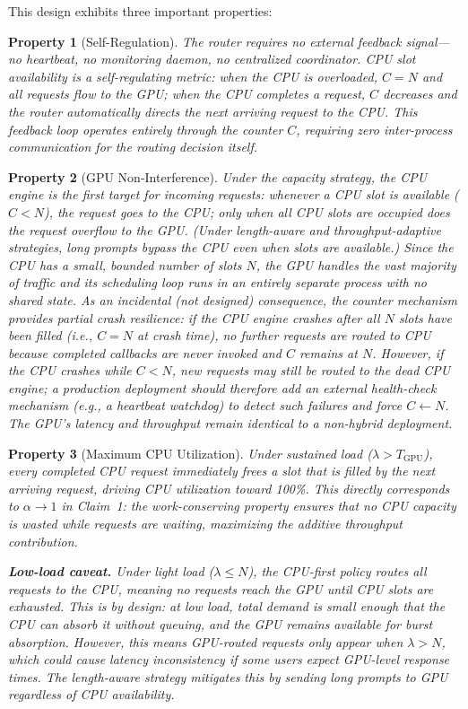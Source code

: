 \documentclass[10pt,conference]{IEEEtran}
\newtheorem{property}{Property}
\begin{document}
This design exhibits three important properties:

\begin{property}[Self-Regulation]
The router requires no external feedback signal---no heartbeat, no monitoring daemon, no centralized coordinator.
CPU slot availability is a self-regulating metric: when the CPU is overloaded, $C = N$ and all requests flow to the GPU; when the CPU completes a request, $C$ decreases and the router automatically directs the next arriving request to the CPU.
This feedback loop operates entirely through the counter $C$, requiring zero inter-process communication for the routing decision itself.
\end{property}

\begin{property}[GPU Non-Interference]
Under the capacity strategy, the CPU engine is the \emph{first} target for incoming requests: whenever a CPU slot is available ($C < N$), the request goes to the CPU; only when all CPU slots are occupied does the request overflow to the GPU.
(Under length-aware and throughput-adaptive strategies, long prompts bypass the CPU even when slots are available.)
Since the CPU has a small, bounded number of slots $N$, the GPU handles the vast majority of traffic and its scheduling loop runs in an entirely separate process with no shared state.
As an incidental (not designed) consequence, the counter mechanism provides partial crash resilience: if the CPU engine crashes \emph{after} all $N$ slots have been filled (i.e., $C = N$ at crash time), no further requests are routed to CPU because completed callbacks are never invoked and $C$ remains at $N$.
However, if the CPU crashes while $C < N$, new requests may still be routed to the dead CPU engine; a production deployment should therefore add an external health-check mechanism (e.g., a heartbeat watchdog) to detect such failures and force $C \gets N$.
The GPU's latency and throughput remain identical to a non-hybrid deployment.
\end{property}

\begin{property}[Maximum CPU Utilization]
Under sustained load ($\lambda > T_\text{GPU}$), every completed CPU request immediately frees a slot that is filled by the next arriving request, driving CPU utilization toward 100\%.
This directly corresponds to $\alpha \to 1$ in Claim~1: the work-conserving property ensures that no CPU capacity is wasted while requests are waiting, maximizing the additive throughput contribution.

\textbf{Low-load caveat.}
Under light load ($\lambda \leq N$), the CPU-first policy routes \emph{all} requests to the CPU, meaning no requests reach the GPU until CPU slots are exhausted.
This is by design: at low load, total demand is small enough that the CPU can absorb it without queuing, and the GPU remains available for burst absorption.
However, this means GPU-routed requests only appear when $\lambda > N$, which could cause latency inconsistency if some users expect GPU-level response times.
The length-aware strategy mitigates this by sending long prompts to GPU regardless of CPU availability.
\end{property}
\end{document}
